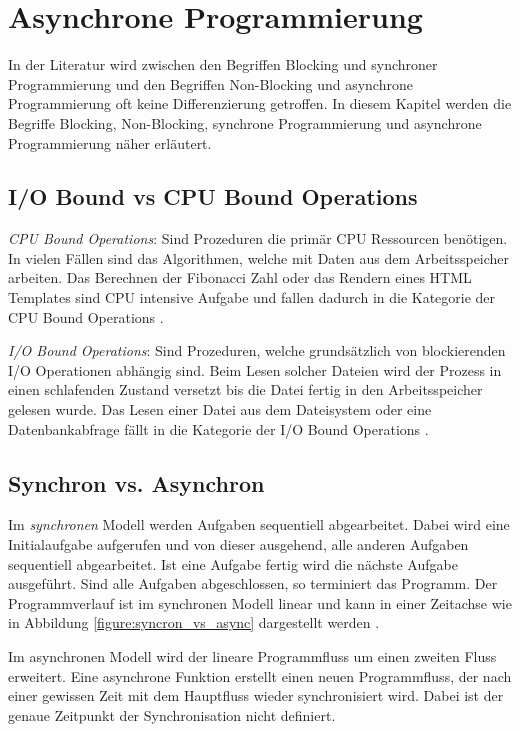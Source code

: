 \section{Asynchrone Programmierung}

In der Literatur wird zwischen den Begriffen Blocking und synchroner Programmierung und den Begriffen Non-Blocking und asynchrone Programmierung oft keine Differenzierung getroffen. In diesem Kapitel werden die Begriffe Blocking, Non-Blocking, synchrone Programmierung und asynchrone Programmierung näher erläutert. 

\subsection{I/O Bound vs CPU Bound Operations}

\emph{CPU Bound Operations}: Sind Prozeduren die primär CPU Ressourcen benötigen. In vielen Fällen sind das Algorithmen, welche mit Daten aus dem Arbeitsspeicher arbeiten. Das Berechnen der Fibonacci Zahl oder das Rendern eines HTML Templates sind CPU intensive Aufgabe und fallen dadurch in die Kategorie der CPU Bound Operations \cite[p. 70]{Erb2012}. 

\emph{I/O Bound Operations}: Sind Prozeduren, welche grundsätzlich von blockierenden I/O Operationen abhängig sind. Beim Lesen solcher Dateien wird der Prozess in einen schlafenden Zustand versetzt bis die Datei fertig in den Arbeitsspeicher gelesen wurde. Das Lesen einer Datei aus dem Dateisystem oder eine Datenbankabfrage fällt in die Kategorie der I/O Bound Operations \cite[p. 70]{Erb2012}. 

\subsection{Synchron vs. Asynchron}

Im \emph{synchronen} Modell werden Aufgaben sequentiell abgearbeitet. Dabei wird eine Initialaufgabe aufgerufen und von dieser ausgehend, alle anderen Aufgaben sequentiell abgearbeitet. Ist eine Aufgabe fertig wird die nächste Aufgabe ausgeführt. Sind alle Aufgaben abgeschlossen, so terminiert das Programm. Der Programmverlauf ist im synchronen Modell linear und kann in einer Zeitachse wie in Abbildung \ref{figure:syncron_vs_async} dargestellt werden \cite[]{Pet2015}.

Im asynchronen Modell wird der lineare Programmfluss um einen zweiten Fluss erweitert. Eine asynchrone Funktion erstellt einen neuen Programmfluss, der nach einer gewissen Zeit mit dem Hauptfluss wieder synchronisiert wird. Dabei ist der genaue Zeitpunkt der Synchronisation nicht definiert. 

